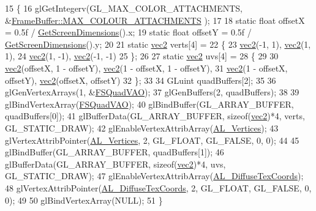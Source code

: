 \begin{DoxyCode}
15 \{
16   glGetIntegerv(GL\_MAX\_COLOR\_ATTACHMENTS, &\hyperlink{class_frame_buffer_a2c1ad7bc95f26f6dee670a838ae863bc}{FrameBuffer::MAX\_COLOUR\_ATTACHMENTS}
      );
17 
18   \textcolor{keyword}{static} \textcolor{keywordtype}{float} offsetX = 0.5f / \hyperlink{_screen_8h_a30da0e5a5d6ee95789dc562a4f495ba9}{GetScreenDimensions}().x;
19   \textcolor{keyword}{static} \textcolor{keywordtype}{float} offsetY = 0.5f / \hyperlink{_screen_8h_a30da0e5a5d6ee95789dc562a4f495ba9}{GetScreenDimensions}().y;
20 
21   \textcolor{keyword}{static} \hyperlink{_types_8h_a43182e59794291f6ab00e51b160706c2}{vec2} verts[4] =
22   \{
23     \hyperlink{_types_8h_a43182e59794291f6ab00e51b160706c2}{vec2}(-1, 1), \hyperlink{_types_8h_a43182e59794291f6ab00e51b160706c2}{vec2}(1, 1),
24     \hyperlink{_types_8h_a43182e59794291f6ab00e51b160706c2}{vec2}(1, -1), \hyperlink{_types_8h_a43182e59794291f6ab00e51b160706c2}{vec2}(-1, -1)
25   \};
26 
27   \textcolor{keyword}{static} \hyperlink{_types_8h_a43182e59794291f6ab00e51b160706c2}{vec2} uvs[4] =
28   \{
29 
30     \hyperlink{_types_8h_a43182e59794291f6ab00e51b160706c2}{vec2}(offsetX, 1 - offsetY), \hyperlink{_types_8h_a43182e59794291f6ab00e51b160706c2}{vec2}(1 - offsetX, 1 - offsetY),
31     \hyperlink{_types_8h_a43182e59794291f6ab00e51b160706c2}{vec2}(1 - offsetX, offsetY), \hyperlink{_types_8h_a43182e59794291f6ab00e51b160706c2}{vec2}(offsetX, offsetY)
32   \};
33 
34   GLuint quadBuffers[2];
35 
36   glGenVertexArrays(1, &\hyperlink{class_frame_buffer_a22b0c9de2bef06e0de865684556a6677}{FSQuadVAO});
37   glGenBuffers(2, quadBuffers);
38 
39   glBindVertexArray(\hyperlink{class_frame_buffer_a22b0c9de2bef06e0de865684556a6677}{FSQuadVAO});
40   glBindBuffer(GL\_ARRAY\_BUFFER, quadBuffers[0]);
41   glBufferData(GL\_ARRAY\_BUFFER, \textcolor{keyword}{sizeof}(\hyperlink{_types_8h_a43182e59794291f6ab00e51b160706c2}{vec2})*4, verts, GL\_STATIC\_DRAW);
42   glEnableVertexAttribArray(\hyperlink{_shader_8h_abeea86fa7b6213f5a961556c17de93c8a8c634dc1801c5734bb1be0648d71149d}{AL\_Vertices});
43   glVertexAttribPointer(\hyperlink{_shader_8h_abeea86fa7b6213f5a961556c17de93c8a8c634dc1801c5734bb1be0648d71149d}{AL\_Vertices}, 2, GL\_FLOAT, GL\_FALSE, 0, 0);
44 
45   glBindBuffer(GL\_ARRAY\_BUFFER, quadBuffers[1]);
46   glBufferData(GL\_ARRAY\_BUFFER, \textcolor{keyword}{sizeof}(\hyperlink{_types_8h_a43182e59794291f6ab00e51b160706c2}{vec2})*4, uvs, GL\_STATIC\_DRAW);
47   glEnableVertexAttribArray(\hyperlink{_shader_8h_abeea86fa7b6213f5a961556c17de93c8a1e6842dedef2c2ca1f605ece408f4150}{AL\_DiffuseTexCoords});
48   glVertexAttribPointer(\hyperlink{_shader_8h_abeea86fa7b6213f5a961556c17de93c8a1e6842dedef2c2ca1f605ece408f4150}{AL\_DiffuseTexCoords}, 2, GL\_FLOAT, GL\_FALSE, 0, 0);
49 
50   glBindVertexArray(NULL);
51 \}
\end{DoxyCode}



